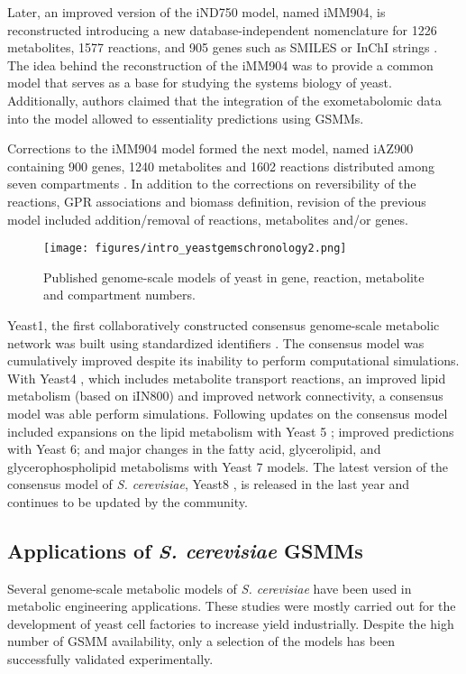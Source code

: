 Later, an improved version of the iND750 model, named iMM904, is reconstructed introducing a new database-independent nomenclature for 1226 metabolites, 1577 reactions, and 905 genes such as SMILES or InChI strings \cite{mo2009connecting}. The idea behind the reconstruction of the iMM904 was to provide a common model that serves as a base for studying the systems biology of yeast. Additionally, authors claimed that the  integration of the exometabolomic data into the model allowed to essentiality predictions using GSMMs.

Corrections to the iMM904 model formed the next model, named iAZ900 containing 900 genes, 1240 metabolites and 1602 reactions distributed among seven compartments \cite{zomorrodi2010improving}. In addition to the corrections on reversibility of the reactions, GPR associations and biomass definition, revision of the previous model included addition/removal of reactions, metabolites and/or genes.

\begin{figure}[H]
\texttt{[image: figures/intro\_yeastgemschronology2.png]}
\caption[Published genome-scale models of yeast in gene, reaction, metabolite and compartment numbers]{Published genome-scale models of yeast in gene, reaction, metabolite and compartment numbers.}
\label{fig:intro_yeastgemschronology2}
\end{figure}

Yeast1, the first collaboratively constructed consensus genome-scale metabolic network was built using standardized identifiers \cite{herrgaard2008consensus}. The consensus model was cumulatively improved despite its inability to perform computational simulations. With Yeast4 \cite{dobson2010further}, which includes metabolite transport reactions, an improved lipid metabolism (based on iIN800) and improved network connectivity, a consensus model was able perform simulations. Following updates on the consensus model included expansions on the lipid metabolism with Yeast 5 \cite{heavner2012yeast}; improved predictions with Yeast 6\cite{heavner2013version}; and major changes in the fatty acid, glycerolipid, and glycerophospholipid metabolisms with Yeast 7 \cite{aung2013revising} models. The latest version of the consensus model of \emph{S. cerevisiae}, Yeast8 \cite{lu2019consensus}, is released in the last year and continues to be updated by the community.


\subsection{Applications of \emph{S. cerevisiae} GSMMs}
Several genome-scale metabolic models of \emph{S. cerevisiae} have been used in metabolic engineering applications. These studies were mostly carried out for the development of yeast cell factories to increase yield industrially. Despite the high number of GSMM availability, only a selection of the models has been successfully validated experimentally.

